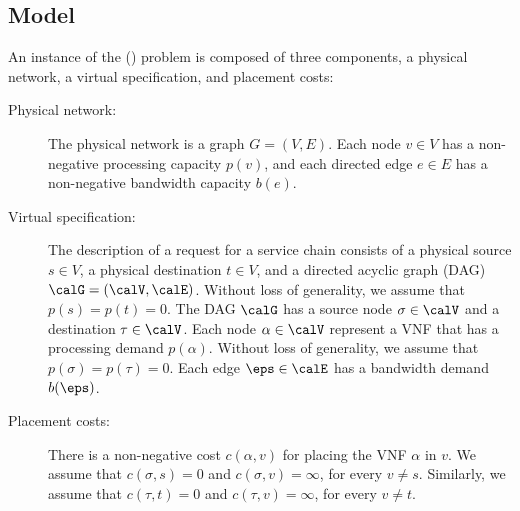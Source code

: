 \subsection{Model}
%
An instance of the \scplong (\scp) problem is composed of three
components, a physical network, a virtual specification, and placement
costs:
\begin{description}
\item[Physical network:]
%
  The physical network is a graph $G = (V,E)$.  Each node $v \in V$
  has a non-negative processing capacity $p(v)$, and each directed
  edge $e \in E$ has a non-negative bandwidth capacity $b(e)$.
%

\medskip
  
\item[Virtual specification:]
%
  The description of a request for a service chain consists of a
  physical source $s \in V$, a physical destination $t \in V$, and a
  directed acyclic graph (DAG) $\calG = (\calV,\calE)$.
%
  Without loss of generality, we assume that $p(s) = p(t) = 0$.  
%
  The DAG $\calG$ has a source node $\sigma \in \calV$ and a
  destination $\tau \in \calV$. Each node $\alpha \in \calV$ represent
  a VNF that has a processing demand $p(\alpha)$.
%
  Without loss of generality, we assume that $p(\sigma) = p(\tau) =
  0$.  Each edge $\eps \in \calE$ has a bandwidth demand $b(\eps)$.

\medskip
  
\item[Placement costs:]
%
  There is a non-negative cost $c(\alpha,v)$ for placing the VNF
  $\alpha$ in $v$.  We assume that $c(\sigma,s) = 0$ and $c(\sigma,v)
  = \infty$, for every $v \neq s$.  Similarly, we assume that
  $c(\tau,t) = 0$ and $c(\tau,v) = \infty$, for every $v \neq t$.
\end{description}

